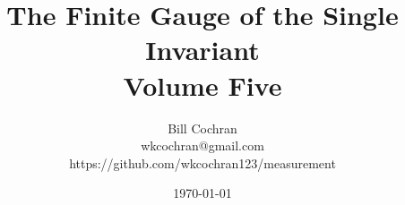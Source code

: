 \documentclass[12pt,oneside]{book}
\begin{document}
\title{The Finite Gauge of the Single Invariant\\
\large Volume Five}

\author{Bill Cochran\\wkcochran@gmail.com\\https://github.com/wkcochran123/measurement}
\date{\today}

\maketitle

\tableofcontents








\end{document}
